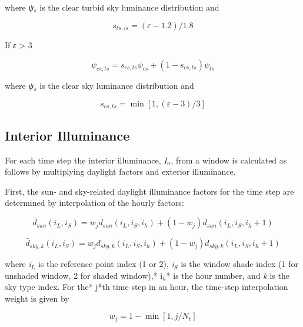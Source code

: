 where \emph{ψ\(_{s}\)} is the clear turbid sky luminance distribution and

\begin{equation}
{s_{ts,is}} = (\varepsilon  - 1.2)/1.8
\end{equation}

If \emph{ε} \textgreater{} 3

\begin{equation}
{\psi_{cs,ts}} = {s_{cs,ts}}{\psi_{cs}} + (1 - {s_{cs,ts}}){\psi_{ts}}
\end{equation}

where \emph{ψ\(_{s}\)} is the clear sky luminance distribution and

\begin{equation}
{s_{cs,ts}} = \min [1,(\varepsilon  - 3)/3]
\end{equation}

\subsection{Interior Illuminance}\label{interior-illuminance}

For each time step the interior illuminance, \emph{I\(_{n}\)}, from a window is calculated as follows by multiplying daylight factors and exterior illuminance.

First, the sun- and sky-related daylight illuminance factors for the time step are determined by interpolation of the hourly factors:

\begin{equation}
{\bar d_{sun}}({i_L},{i_S}) = {w_j}{d_{sun}}({i_L},{i_S},{i_h}) + (1 - {w_j}){d_{sun}}({i_L},{i_S},{i_h} + 1)
\end{equation}

\begin{equation}
{\bar d_{sky,k}}({i_L},{i_S}) = {w_j}{d_{sky,k}}({i_L},{i_S},{i_h}) + (1 - {w_j}){d_{sky,k}}({i_L},{i_S},{i_h} + 1)
\end{equation}

where \emph{i\(_{L}\)} is the reference point index (1 or 2), \emph{i\(_{S}\)} is the window shade index (1 for unshaded window, 2 for shaded window),* i\(_{h}\)* is the hour number, and \emph{k} is the sky type index. For the* j*th time step in an hour, the time-step interpolation weight is given by

\begin{equation}
{w_j} = 1 - \min [1,j/{N_t}]
\end{equation}

